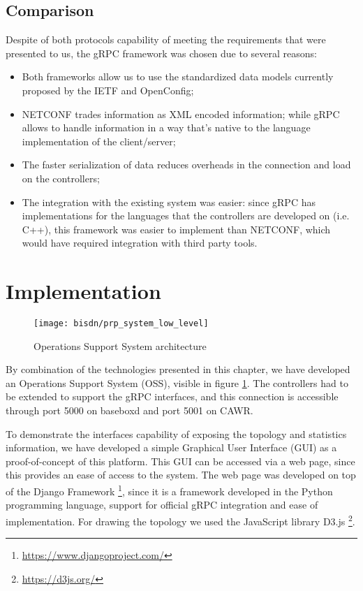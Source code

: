 \subsection{Comparison}

\par Despite of both protocols capability of meeting the requirements that were presented to us, the gRPC framework was chosen due to several reasons:

\begin {itemize}
    \item Both frameworks allow us to use the standardized data models currently proposed by the IETF and OpenConfig;
    \item NETCONF trades information as XML encoded information; while gRPC allows to handle information in a way that’s native to the language implementation 
        of the client/server;
    \item The faster serialization of data reduces overheads in the connection and load on the controllers;
    \item The integration with the existing system was easier: since gRPC has implementations for the languages that the controllers are developed on
        (i.e. C++), this framework was easier to implement than NETCONF, which would have required integration with third party tools.
\end {itemize}

\section {Implementation}

\begin{figure}
    \centering
    \texttt{[image: bisdn/prp\_system\_low\_level]}
    \caption{Operations Support System architecture}
    \label{fig:oss}
\end{figure}

By combination of the technologies presented in this chapter, we have developed an Operations Support System (OSS), visible in figure \ref{fig:oss}. The controllers
had to be extended to support the gRPC interfaces, and this connection is accessible through port 5000 on baseboxd and port 5001 on CAWR.

\par To demonstrate the interfaces capability of exposing the topology and statistics information, we have developed a simple Graphical User Interface (GUI) as a 
proof-of-concept of this platform. This GUI can be accessed via a web page, since this provides an ease of access to the system.  The web page was developed on top
of the Django Framework \footnote{\url{https://www.djangoproject.com/}}, since it is a framework developed in the Python programming language, support for official 
gRPC integration and ease of implementation. For drawing the topology we used the JavaScript library D3.js \footnote{\url{https://d3js.org/}}.

